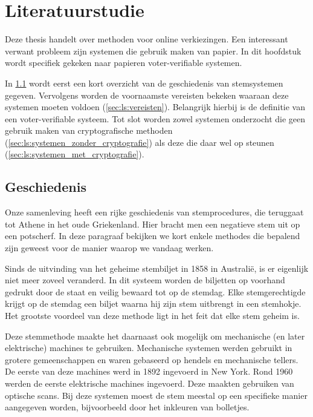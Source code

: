 %
%

\chapter{Literatuurstudie}
\label{chap:literatuurstudie}

Deze thesis handelt over methoden voor online verkiezingen. Een interessant verwant probleem zijn systemen die gebruik maken van papier. In dit hoofdstuk wordt specifiek gekeken naar papieren voter-verifiable systemen.

\npar In \ref{sec:ls:geschiedenis} wordt eerst een kort overzicht van de geschiedenis van stemsystemen gegeven. Vervolgens worden de voornaamste vereisten bekeken waaraan deze systemen moeten voldoen (\ref{sec:ls:vereisten}). Belangrijk hierbij is de definitie van een voter-verifiable systeem. Tot slot worden zowel systemen onderzocht die geen gebruik maken van cryptografische methoden (\ref{sec:ls:systemen_zonder_cryptografie}) als deze die daar wel op steunen (\ref{sec:ls:systemen_met_cryptografie}).

\section[Geschiedenis]{Geschiedenis~\cite{adida_advances_in_cryptographic_voting_systems}}
\label{sec:ls:geschiedenis}

Onze samenleving heeft een rijke geschiedenis van stemprocedures, die teruggaat tot Athene in het oude Griekenland. Hier bracht men een negatieve stem uit op een potscherf. In deze paragraaf bekijken we kort enkele methodes die bepalend zijn geweest voor de manier waarop we vandaag werken.\cite{wiki:ostracon}

\npar Sinds de uitvinding van het geheime stembiljet in 1858 in Australi\"e, is er eigenlijk niet meer zoveel veranderd. In dit systeem worden de biljetten op voorhand gedrukt door de staat en veilig bewaard tot op de stemdag. Elke stemgerechtigde krijgt op de stemdag een biljet waarna hij zijn stem uitbrengt in een stemhokje. Het grootste voordeel van deze methode ligt in het feit dat elke stem geheim is.

\npar Deze stemmethode maakte het daarnaast ook mogelijk om mechanische (en later elektrische) machines te gebruiken. Mechanische systemen werden gebruikt in grotere gemeenschappen en waren gebaseerd op hendels en mechanische tellers. De eerste van deze machines werd in 1892 ingevoerd in New York. Rond 1960 werden de eerste elektrische machines ingevoerd. Deze maakten gebruiken van optische scans. Bij deze systemen moest de stem meestal op een specifieke manier aangegeven worden, bijvoorbeeld door het inkleuren van bolletjes.

